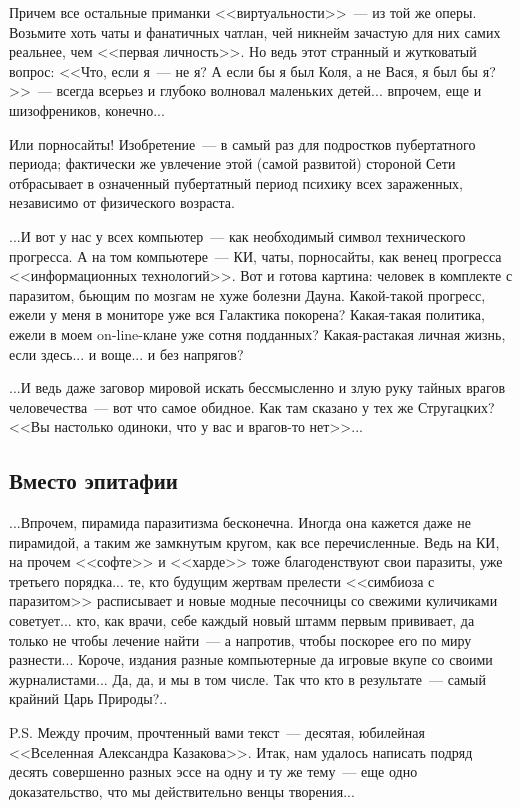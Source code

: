 \documentclass{scrbook}
\newcommand{\flqq}{<<}
\newcommand{\frqq}{>>}
\newcommand{\mdash}{~--- }
\newcommand{\essaysection}[1]{\subsection*{#1}\nopagebreak}
\begin{document}
Причем все остальные приманки {\flqq}виртуальности{\frqq}{\mdash}из той же оперы. Возьмите хоть чаты и фанатичных чатлан, чей никнейм зачастую для них самих реальнее, чем {\flqq}первая личность{\frqq}. Но ведь этот странный и жутковатый вопрос: {\flqq}Что, если я{\mdash}не я? А если бы я был Коля, а не Вася, я был бы я?{\frqq}{\mdash}всегда всерьез и глубоко волновал маленьких детей... впрочем, еще и шизофреников, конечно...

Или порносайты! Изобретение{\mdash}в самый раз для подростков пубертатного периода; фактически же увлечение этой (самой развитой) стороной Сети отбрасывает в означенный пубертатный период психику всех зараженных, независимо от физического возраста.

...И вот у нас у всех компьютер{\mdash}как необходимый символ технического прогресса. А на том компьютере{\mdash}КИ, чаты, порносайты, как венец прогресса {\flqq}информационных технологий{\frqq}. Вот и готова картина: человек в комплекте с паразитом, бьющим по мозгам не хуже болезни Дауна. Какой-такой прогресс, ежели у меня в мониторе уже вся Галактика покорена? Какая-такая политика, ежели в моем on-line-клане уже сотня подданных? Какая-растакая личная жизнь, если здесь... и воще... и без напрягов?

...И ведь даже заговор мировой искать бессмысленно и злую руку тайных врагов человечества{\mdash}вот что самое обидное. Как там сказано у тех же Стругацких? {\flqq}Вы настолько одиноки, что у вас и врагов-то нет{\frqq}...

\essaysection{Вместо эпитафии}

...Впрочем, пирамида паразитизма бесконечна. Иногда она кажется даже не пирамидой, а таким же замкнутым кругом, как все перечисленные. Ведь на КИ, на прочем {\flqq}софте{\frqq} и {\flqq}харде{\frqq} тоже благоденствуют свои паразиты, уже третьего порядка... те, кто будущим жертвам прелести {\flqq}симбиоза с паразитом{\frqq} расписывает и новые модные песочницы со свежими куличиками советует... кто, как врачи, себе каждый новый штамм первым прививает, да только не чтобы лечение найти{\mdash}а напротив, чтобы поскорее его по миру разнести... Короче, издания разные компьютерные да игровые вкупе со своими журналистами... Да, да, и мы в том числе. Так что кто в результате{\mdash}самый крайний Царь Природы?..

P.S. Между прочим, прочтенный вами текст{\mdash}десятая, юбилейная {\flqq}Вселенная Александра Казакова{\frqq}. Итак, нам удалось написать подряд десять совершенно разных эссе на одну и ту же тему{\mdash}еще одно доказательство, что мы действительно венцы творения...
\end{document}
